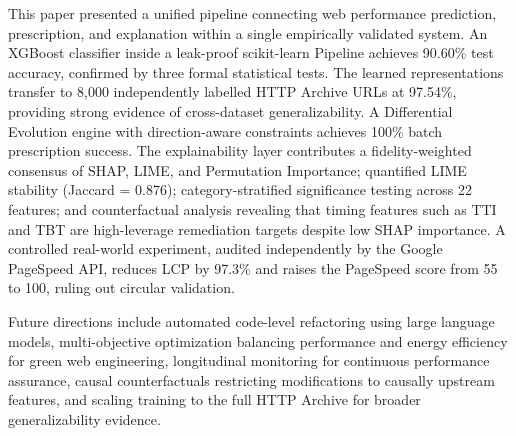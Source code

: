 \documentclass{svproc}
\begin{document}
This paper presented a unified pipeline connecting web performance prediction, prescription, and explanation within a single empirically validated system. An XGBoost classifier inside a leak-proof scikit-learn Pipeline achieves 90.60\% test accuracy, confirmed by three formal statistical tests. The learned representations transfer to 8,000 independently labelled HTTP Archive URLs at 97.54\%, providing strong evidence of cross-dataset generalizability. A Differential Evolution engine with direction-aware constraints achieves 100\% batch prescription success. The explainability layer contributes a fidelity-weighted consensus of SHAP, LIME, and Permutation Importance; quantified LIME stability (Jaccard = 0.876); category-stratified significance testing across 22 features; and counterfactual analysis revealing that timing features such as TTI and TBT are high-leverage remediation targets despite low SHAP importance. A controlled real-world experiment, audited independently by the Google PageSpeed API, reduces LCP by 97.3\% and raises the PageSpeed score from 55 to 100, ruling out circular validation.

Future directions include automated code-level refactoring using large language models, multi-objective optimization balancing performance and energy efficiency for green web engineering, longitudinal monitoring for continuous performance assurance, causal counterfactuals restricting modifications to causally upstream features, and scaling training to the full HTTP Archive for broader generalizability evidence.
\end{document}
